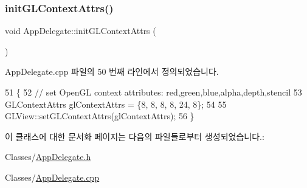 \subsubsection{\texorpdfstring{init\+G\+L\+Context\+Attrs()}{initGLContextAttrs()}}
{\footnotesize\ttfamily void App\+Delegate\+::init\+G\+L\+Context\+Attrs (\begin{DoxyParamCaption}{ }\end{DoxyParamCaption})\hspace{0.3cm}{\ttfamily [virtual]}}



App\+Delegate.\+cpp 파일의 50 번째 라인에서 정의되었습니다.


\begin{DoxyCode}
51 \{
52     \textcolor{comment}{// set OpenGL context attributes: red,green,blue,alpha,depth,stencil}
53     GLContextAttrs glContextAttrs = \{8, 8, 8, 8, 24, 8\};
54 
55     GLView::setGLContextAttrs(glContextAttrs);
56 \}
\end{DoxyCode}


이 클래스에 대한 문서화 페이지는 다음의 파일들로부터 생성되었습니다.\+:\begin{DoxyCompactItemize}
\item 
Classes/\hyperlink{_app_delegate_8h}{App\+Delegate.\+h}\item 
Classes/\hyperlink{_app_delegate_8cpp}{App\+Delegate.\+cpp}\end{DoxyCompactItemize}
